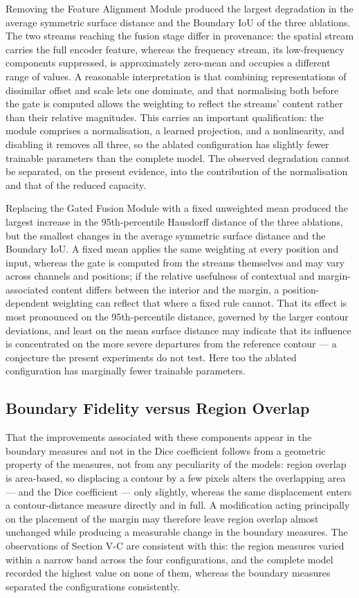 Removing the Feature Alignment Module produced the largest degradation in the average symmetric surface distance and the Boundary IoU of the three ablations. The two streams reaching the fusion stage differ in provenance: the spatial stream carries the full encoder feature, whereas the frequency stream, its low-frequency components suppressed, is approximately zero-mean and occupies a different range of values. A reasonable interpretation is that combining representations of dissimilar offset and scale lets one dominate, and that normalising both before the gate is computed allows the weighting to reflect the streams' content rather than their relative magnitudes. This carries an important qualification: the module comprises a normalisation, a learned projection, and a nonlinearity, and disabling it removes all three, so the ablated configuration has slightly fewer trainable parameters than the complete model. The observed degradation cannot be separated, on the present evidence, into the contribution of the normalisation and that of the reduced capacity.

Replacing the Gated Fusion Module with a fixed unweighted mean produced the largest increase in the 95th-percentile Hausdorff distance of the three ablations, but the smallest changes in the average symmetric surface distance and the Boundary IoU. A fixed mean applies the same weighting at every position and input, whereas the gate is computed from the streams themselves and may vary across channels and positions; if the relative usefulness of contextual and margin-associated content differs between the interior and the margin, a position-dependent weighting can reflect that where a fixed rule cannot. That its effect is most pronounced on the 95th-percentile distance, governed by the larger contour deviations, and least on the mean surface distance may indicate that its influence is concentrated on the more severe departures from the reference contour --- a conjecture the present experiments do not test. Here too the ablated configuration has marginally fewer trainable parameters.

\subsection{Boundary Fidelity versus Region Overlap}

That the improvements associated with these components appear in the boundary measures and not in the Dice coefficient follows from a geometric property of the measures, not from any peculiarity of the models: region overlap is area-based, so displacing a contour by a few pixels alters the overlapping area --- and the Dice coefficient --- only slightly, whereas the same displacement enters a contour-distance measure directly and in full. A modification acting principally on the placement of the margin may therefore leave region overlap almost unchanged while producing a measurable change in the boundary measures. The observations of Section V-C are consistent with this: the region measures varied within a narrow band across the four configurations, and the complete model recorded the highest value on none of them, whereas the boundary measures separated the configurations consistently.

